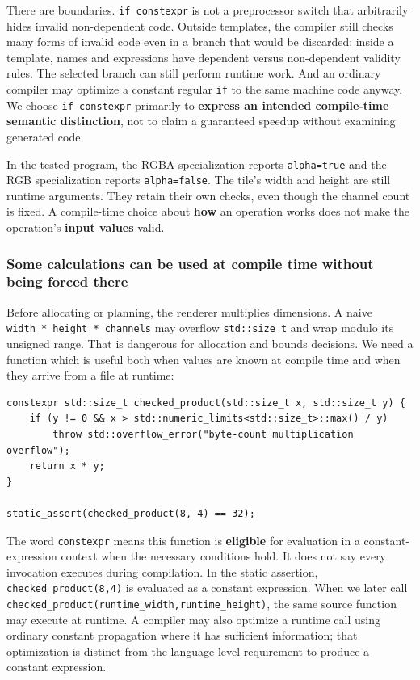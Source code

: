 There are boundaries. \texttt{if\ constexpr} is not a preprocessor switch that arbitrarily hides invalid non-dependent code. Outside templates, the compiler still checks many forms of invalid code even in a branch that would be discarded; inside a template, names and expressions have dependent versus non-dependent validity rules. The selected branch can still perform runtime work. And an ordinary compiler may optimize a constant regular \texttt{if} to the same machine code anyway. We choose \texttt{if\ constexpr} primarily to \textbf{express an intended compile-time semantic distinction}, not to claim a guaranteed speedup without examining generated code.

In the tested program, the RGBA specialization reports \texttt{alpha=true} and the RGB specialization reports \texttt{alpha=false}. The tile's width and height are still runtime arguments. They retain their own checks, even though the channel count is fixed. A compile-time choice about \textbf{how} an operation works does not make the operation's \textbf{input values} valid.

\subsubsection{Some calculations can be used at compile time without being forced there}\label{some-calculations-can-be-used-at-compile-time-without-being-forced-there}

Before allocating or planning, the renderer multiplies dimensions. A naive \texttt{width\ *\ height\ *\ channels} may overflow \texttt{std::size\_t} and wrap modulo its unsigned range. That is dangerous for allocation and bounds decisions. We need a function which is useful both when values are known at compile time and when they arrive from a file at runtime:

\begin{verbatim}
constexpr std::size_t checked_product(std::size_t x, std::size_t y) {
    if (y != 0 && x > std::numeric_limits<std::size_t>::max() / y)
        throw std::overflow_error("byte-count multiplication overflow");
    return x * y;
}

static_assert(checked_product(8, 4) == 32);
\end{verbatim}

The word \texttt{constexpr} means this function is \textbf{eligible} for evaluation in a constant-expression context when the necessary conditions hold. It does not say every invocation executes during compilation. In the static assertion, \texttt{checked\_product(8,4)} is evaluated as a constant expression. When we later call \texttt{checked\_product(runtime\_width,runtime\_height)}, the same source function may execute at runtime. A compiler may also optimize a runtime call using ordinary constant propagation where it has sufficient information; that optimization is distinct from the language-level requirement to produce a constant expression.

